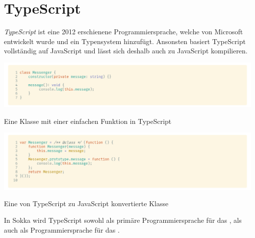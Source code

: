 \section{TypeScript}
\label{typescript}

\textit{TypeScript} ist eine 2012 erschienene Programmiersprache, welche von Microsoft entwickelt wurde und \textit{} ein Typensystem hinzufügt. Ansonsten basiert TypeScript vollständig auf JavaScript und lässt sich deshalb auch zu JavaScript kompilieren.

\begin{code}[htp]
    \begin{center}
        \includegraphics[width=1\textwidth]{images/TypeScript/TS.png}
        \vspace{-25pt}
        \caption{Eine Klasse mit einer einfachen Funktion in TypeScript}
    \end{center}
\end{code}

\begin{code}[htp]
    \begin{center}
        \includegraphics[width=1\textwidth]{images/TypeScript/JS.png}
        \vspace{-25pt}
        \caption{Eine von TypeScript zu JavaScript konvertierte Klasse}
    \end{center}
\end{code}

In Sokka wird TypeScript sowohl als primäre Programmiersprache für das , als auch als Programmiersprache für das .